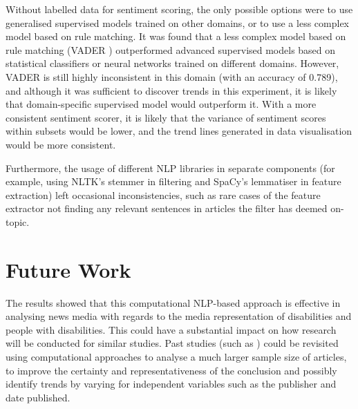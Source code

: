 \documentclass{report}
\begin{document}
Without labelled data for sentiment scoring, the only possible options were to use generalised supervised models trained on other domains, or to use a less complex model based on rule matching.
It was found that a less complex model based on rule matching (VADER \cite{VADER}) outperformed advanced supervised models based on statistical classifiers or neural networks trained on different domains.
However, VADER is still highly inconsistent in this domain (with an accuracy of 0.789), and although it was sufficient to discover trends in this experiment, it is likely that domain-specific supervised model would outperform it.
With a more consistent sentiment scorer, it is likely that the variance of sentiment scores within subsets would be lower, and the trend lines generated in data visualisation would be more consistent.

Furthermore, the usage of different NLP libraries in separate components (for example, using NLTK's stemmer in filtering and SpaCy's lemmatiser in feature extraction) left occasional inconsistencies, such as rare cases of the feature extractor not finding any relevant sentences in articles the filter has deemed on-topic.

\section{Future Work} \label{Future Work}

The results showed that this computational NLP-based approach is effective in analysing news media with regards to the media representation of disabilities and people with disabilities.
This could have a substantial impact on how research will be conducted for similar studies.
Past studies (such as \cite{gold1999media, coverdale2002depictions, jones2009representations, devotta2013representations}) could be revisited using computational approaches to analyse a much larger sample size of articles, to improve the certainty and representativeness of the conclusion and possibly identify trends by varying for independent variables such as the publisher and date published.
\end{document}
